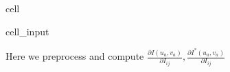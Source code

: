 \documentclass[letterpaper,10pt,english]{jupyterBook}
\begin{document}
\begin{sphinxuseclass}{cell}\begin{sphinxVerbatimInput}

\begin{sphinxuseclass}{cell_input}
\begin{sphinxVerbatim}[commandchars=\\\{\}]
   
   
  
\end{sphinxVerbatim}

\end{sphinxuseclass}\end{sphinxVerbatimInput}

\end{sphinxuseclass}
\sphinxAtStartPar
Here we preprocess and compute \(\frac{\partial I(u_a,v_a)}{\partial I_{ij}}, \frac{\partial I^*(u_a,v_a)}{\partial I_{ij}}\)
\end{document}
